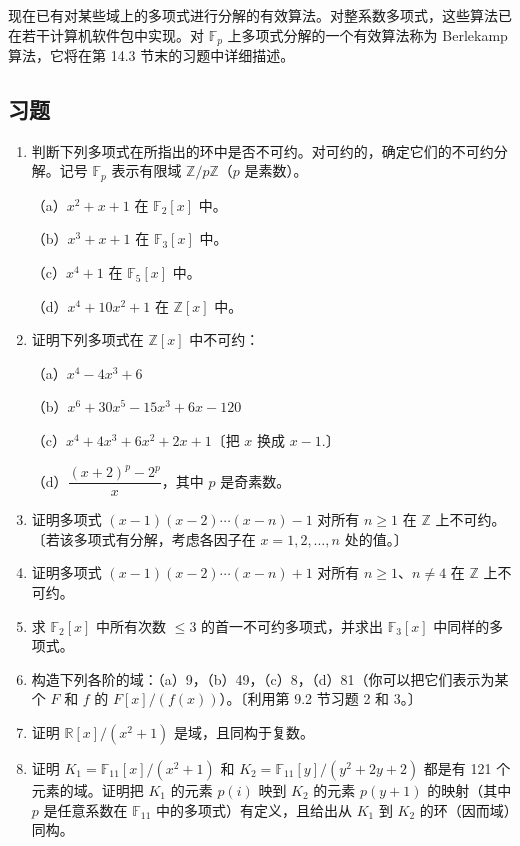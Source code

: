 现在已有对某些域上的多项式进行分解的有效算法。对整系数多项式，这些算法已在若干计算机软件包中实现。对 \(\mathbb{F}_p\) 上多项式分解的一个有效算法称为 Berlekamp 算法，它将在第 14.3 节末的习题中详细描述。

\subsection*{习题}

\begin{enumerate}
\item 判断下列多项式在所指出的环中是否不可约。对可约的，确定它们的不可约分解。记号 \(\mathbb{F}_p\) 表示有限域 \(\mathbb{Z}/p\mathbb{Z}\)（\(p\) 是素数）。

（a）\(x^2+x+1\) 在 \(\mathbb{F}_2[x]\) 中。

（b）\(x^3+x+1\) 在 \(\mathbb{F}_3[x]\) 中。

（c）\(x^4+1\) 在 \(\mathbb{F}_5[x]\) 中。

（d）\(x^4+10x^2+1\) 在 \(\mathbb{Z}[x]\) 中。

\item 证明下列多项式在 \(\mathbb{Z}[x]\) 中不可约：

（a）\(x^4-4x^3+6\)

（b）\(x^6+30x^5-15x^3+6x-120\)

（c）\(x^4+4x^3+6x^2+2x+1\)〔把 \(x\) 换成 \(x-1\).〕

（d）\(\dfrac{(x+2)^p-2^p}{x}\)，其中 \(p\) 是奇素数。

\item 证明多项式 \((x-1)(x-2)\cdots(x-n)-1\) 对所有 \(n \geq 1\) 在 \(\mathbb{Z}\) 上不可约。〔若该多项式有分解，考虑各因子在 \(x = 1, 2, \ldots, n\) 处的值。〕

\item 证明多项式 \((x-1)(x-2)\cdots(x-n)+1\) 对所有 \(n \geq 1\)、\(n \neq 4\) 在 \(\mathbb{Z}\) 上不可约。

\item 求 \(\mathbb{F}_2[x]\) 中所有次数 \(\leq 3\) 的首一不可约多项式，并求出 \(\mathbb{F}_3[x]\) 中同样的多项式。

\item 构造下列各阶的域：（a）9，（b）49，（c）8，（d）81（你可以把它们表示为某个 \(F\) 和 \(f\) 的 \(F[x]/(f(x))\)）。〔利用第 9.2 节习题 2 和 3。〕

\item 证明 \(\mathbb{R}[x]/(x^2+1)\) 是域，且同构于复数。

\item 证明 \(K_1 = \mathbb{F}_{11}[x]/(x^2+1)\) 和 \(K_2 = \mathbb{F}_{11}[y]/(y^2+2y+2)\) 都是有 121 个元素的域。证明把 \(K_1\) 的元素 \(p(i)\) 映到 \(K_2\) 的元素 \(p(y+1)\) 的映射（其中 \(p\) 是任意系数在 \(\mathbb{F}_{11}\) 中的多项式）有定义，且给出从 \(K_1\) 到 \(K_2\) 的环（因而域）同构。


\end{enumerate}
